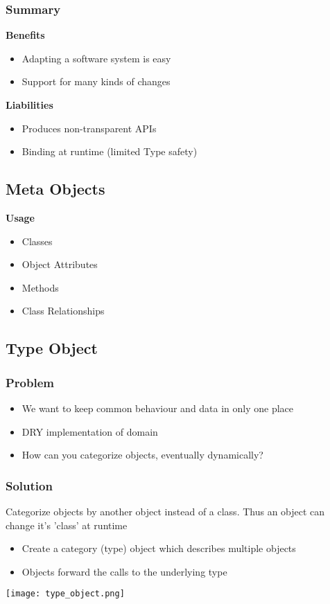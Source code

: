 \subsubsection{Summary}
\textbf{Benefits}
\begin{itemize}
    \item Adapting a software system is easy
    \item Support for many kinds of changes
\end{itemize}
\textbf{Liabilities}
\begin{itemize}
    \item Produces non-transparent APIs
    \item Binding at runtime (limited Type safety)
\end{itemize}

\subsection{Meta Objects}
\textbf{Usage}
\begin{itemize}
    \item Classes
    \item Object Attributes
    \item Methods
    \item Class Relationships
\end{itemize}

\subsection{Type Object}
\subsubsection{Problem}
\begin{itemize}
    \item We want to keep common behaviour and data in only one place
    \item DRY implementation of domain
    \item How can you categorize objects, eventually dynamically?
\end{itemize}
\subsubsection{Solution}
Categorize objects by another object instead of a class. Thus an object can change it's 'class' at runtime
\begin{itemize}
    \item Create a category (type) object which describes multiple objects
    \item Objects forward the calls to the underlying type
\end{itemize}
\texttt{[image: type\_object.png]}
